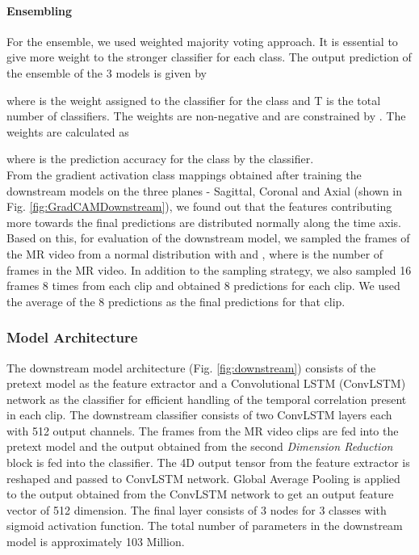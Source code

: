 \documentclass[journal]{IEEEtai}
\begin{document}
\paragraph{Ensembling}
 For the ensemble, we used weighted majority voting \cite{ensemblebook} approach. It is essential to give more weight to the stronger classifier for each class. The output prediction of the ensemble of the 3 models is given by 

where  is the weight assigned to the classifier  for the  class and T is the total number of classifiers. The weights are non-negative and are constrained by . The weights are calculated as 

where  is the prediction accuracy for the  class by the  classifier.\\
\indent From the gradient activation class mappings obtained after training the downstream models on the three planes - Sagittal, Coronal and Axial (shown in Fig. \ref{fig:GradCAMDownstream}), we found out that the features contributing more towards the final predictions are distributed normally along the time axis. Based on this, for evaluation of the downstream model, we sampled the frames of the MR video from a normal distribution with  and , where  is the number of frames in the MR video. In addition to the sampling strategy, we also sampled 16 frames 8 times from each clip and obtained 8 predictions for each clip. We used the average of the 8 predictions as the final predictions for that clip.

\subsubsection{Model Architecture}
\label{subsubsec:downstream_model_arch}

\indent The downstream model architecture (Fig. \ref{fig:downstream}) consists of the pretext model as the feature extractor and a Convolutional LSTM (ConvLSTM) network \cite{convlstm} as the classifier for efficient handling of the temporal correlation present in each clip. The downstream classifier consists of two ConvLSTM layers each with 512 output channels. The frames from the MR video clips are fed into the pretext model and the output obtained from the second \textit{Dimension Reduction} block is fed into the classifier. The 4D output tensor from the feature extractor is reshaped and passed to ConvLSTM network. Global Average Pooling is applied to the output obtained from the ConvLSTM network to get an output feature vector of 512 dimension. The final layer consists of 3 nodes for 3 classes with sigmoid activation function. The total number of parameters in the downstream model is approximately 103 Million.
\end{document}

